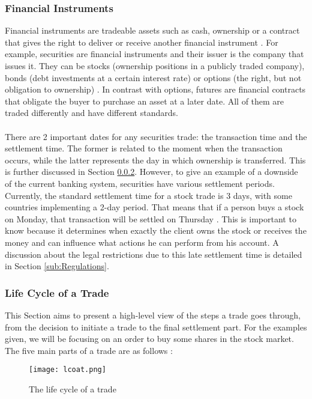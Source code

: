 \documentclass[12pt,twoside]{article}
\begin{document}
\subsubsection{Financial Instruments}
\label{sub:FinancialInstruments}
Financial instruments are tradeable assets such as cash, ownership or a contract that gives the right to deliver or receive another financial instrument \cite{FA}. For example, securities are financial instruments and their issuer is the company that issues it. They can be stocks (ownership positions in a publicly traded company), bonds (debt investments at a certain interest rate) or options (the right, but not obligation to ownership) \cite{Security}. In contrast with options, futures are financial contracts that obligate the buyer to purchase an asset at a later date. All of them are traded differently and have different standards. 
\\ \\
There are 2 important dates for any securities trade: the transaction time and the settlement time. The former is related to the moment when the transaction occurs, while the latter represents the day in which ownership is transferred. This is further discussed in Section \ref{sub:LCOAT}. However, to give an example of a downside of the current banking system, securities have various settlement periods. Currently, the standard settlement time for a stock trade is 3 days, with some countries implementing a 2-day period. That means that if a person buys a stock on Monday, that transaction will be settled on Thursday \cite{TTimes}. This is important to know because it determines when exactly the client owns the stock or receives the money and can influence what actions he can perform from his account. A discussion about the legal restrictions due to this late settlement time is detailed in Section \ref{sub:Regulations}.
\subsubsection{Life Cycle of a Trade}
\label{sub:LCOAT}
This Section aims to present a high-level view of the steps a trade goes through, from the decision to initiate a trade to the final settlement part. For the examples given, we will be focusing on an order to buy some shares in the stock market. The five main parts of a trade are as follows \cite{TradeCycle}:

\begin{figure}[H]
\centering
\texttt{[image: lcoat.png]}
\centering
\caption{The life cycle of a trade}
\label{fig:scheme}
\end{figure}
\end{document}
